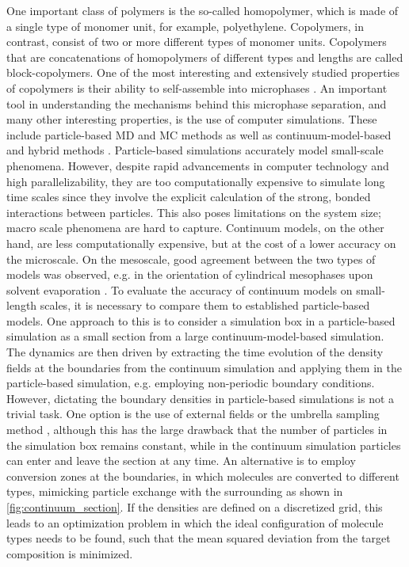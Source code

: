 \documentclass[bachelor,       %
               oneside,        %
               BCOR10mm,       %
               ngerman, english %
               ]{GAUBM}
\begin{document}
One important class of polymers is the so-called homopolymer, which is made of a single type of monomer unit, for example, polyethylene. Copolymers, in contrast, consist of two or more different types of monomer units. Copolymers that are concatenations of homopolymers of different types and lengths are called block-copolymers. One of the most interesting and extensively studied properties of copolymers is their ability to self-assemble into microphases \cite{leibler1980theory}. An important tool in understanding the mechanisms behind this microphase separation, and many other interesting properties, is the use of computer simulations. These include particle-based \ac{MD} and \ac{MC} methods as well as continuum-model-based and hybrid methods \cite{Shuanhu2017}. Particle-based simulations accurately model small-scale phenomena. However, despite rapid advancements in computer technology and high parallelizability, they are too computationally expensive to simulate long time scales since they involve the explicit calculation of the strong, bonded interactions between particles. This also poses limitations on the system size; macro scale phenomena are hard to capture. Continuum models, on the other hand, are less computationally expensive, but at the cost of a lower accuracy on the microscale. On the mesoscale, good agreement between the two types of models was observed, e.g. in the orientation of cylindrical mesophases upon solvent evaporation \cite{Dreyer22}. To evaluate the accuracy of continuum models on small-length scales, it is necessary to compare them to established particle-based models. One approach to this is to consider a simulation box in a particle-based simulation as a small section from a large continuum-model-based simulation. The dynamics are then driven by extracting the time evolution of the density fields at the boundaries from the continuum simulation and applying them in the particle-based simulation, e.g. employing non-periodic boundary conditions. However, dictating the boundary densities in particle-based simulations is not a trivial task. One option is the use of external fields or the umbrella sampling method \cite{glenn74}, although this has the large drawback that the number of particles in the simulation box remains constant, while in the continuum simulation particles can enter and leave the section at any time. An alternative is to employ conversion zones at the boundaries, in which molecules are converted to different types, mimicking particle exchange with the surrounding as shown in \autoref{fig:continuum_section}. If the densities are defined on a discretized grid, this leads to an optimization problem in which the ideal configuration of molecule types needs to be found, such that the mean squared deviation from the target composition is minimized. \\
\end{document}
